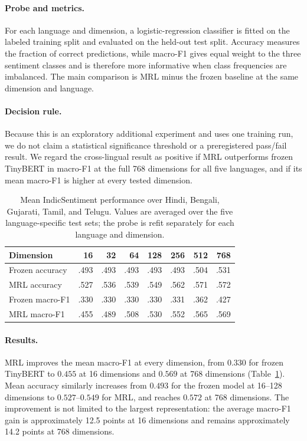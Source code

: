 \paragraph{Probe and metrics.}
For each language and dimension, a logistic-regression classifier is fitted
on the labeled training split and evaluated on the held-out test split.
Accuracy measures the fraction of correct predictions, while macro-F1 gives
equal weight to the three sentiment classes and is therefore more informative
when class frequencies are imbalanced.  The main comparison is MRL minus the
frozen baseline at the same dimension and language.

\paragraph{Decision rule.}
Because this is an exploratory additional experiment and uses one training
run, we do not claim a statistical significance threshold or a preregistered
pass/fail result.  We regard the cross-lingual result as positive if MRL
outperforms frozen TinyBERT in macro-F1 at the full 768 dimensions for all
five languages, and if its mean macro-F1 is higher at every tested dimension.

\begin{table}[t]
\centering
\small
\setlength{\tabcolsep}{3.5pt}
\begin{tabular}{@{}lrrrrrrr@{}}
\toprule
Dimension & 16 & 32 & 64 & 128 & 256 & 512 & 768 \\
\midrule
Frozen accuracy & .493 & .493 & .493 & .493 & .493 & .504 & .531 \\
MRL accuracy & .527 & .536 & .539 & .549 & .562 & .571 & .572 \\
Frozen macro-F1 & .330 & .330 & .330 & .330 & .331 & .362 & .427 \\
MRL macro-F1 & .455 & .489 & .508 & .530 & .552 & .565 & .569 \\
\bottomrule
\end{tabular}
\caption{Mean IndicSentiment performance over Hindi, Bengali, Gujarati,
Tamil, and Telugu. Values are averaged over the five language-specific test
sets; the probe is refit separately for each language and dimension.}
\label{tab:indic-mrl}
\end{table}

\paragraph{Results.}
MRL improves the mean macro-F1 at every dimension, from $0.330$ for frozen
TinyBERT to $0.455$ at 16 dimensions and $0.569$ at 768 dimensions
(Table~\ref{tab:indic-mrl}).  Mean accuracy similarly increases from
$0.493$ for the frozen model at 16--128 dimensions to $0.527$--$0.549$ for
MRL, and reaches $0.572$ at 768 dimensions.  The improvement is not limited
to the largest representation: the average macro-F1 gain is approximately
12.5 points at 16 dimensions and remains approximately 14.2 points at 768
dimensions.

